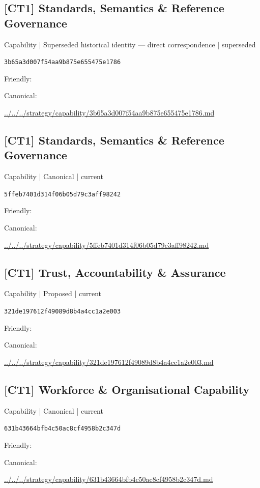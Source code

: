 \documentclass[10pt,a4paper]{article}
\begin{document}
\subsection*{[CT1] Standards, Semantics \& Reference Governance}
{\small Capability | Superseded historical identity — direct correspondence | superseded}\par
\texttt{3b65a3d007f54aa9b875e655475e1786}\par
Friendly: \par
Canonical: \par
{\footnotesize\url{../../../strategy/capability/3b65a3d007f54aa9b875e655475e1786.md}}\par
\subsection*{[CT1] Standards, Semantics \& Reference Governance}
{\small Capability | Canonical | current}\par
\texttt{5ffeb7401d314f06b05d79c3aff98242}\par
Friendly: \par
Canonical: \par
{\footnotesize\url{../../../strategy/capability/5ffeb7401d314f06b05d79c3aff98242.md}}\par
\subsection*{[CT1] Trust, Accountability \& Assurance}
{\small Capability | Proposed | current}\par
\texttt{321de197612f49089d8b4a4cc1a2e003}\par
Friendly: \par
Canonical: \par
{\footnotesize\url{../../../strategy/capability/321de197612f49089d8b4a4cc1a2e003.md}}\par
\subsection*{[CT1] Workforce \& Organisational Capability}
{\small Capability | Canonical | current}\par
\texttt{631b43664bfb4c50ac8cf4958b2c347d}\par
Friendly: \par
Canonical: \par
{\footnotesize\url{../../../strategy/capability/631b43664bfb4c50ac8cf4958b2c347d.md}}\par
\end{document}
